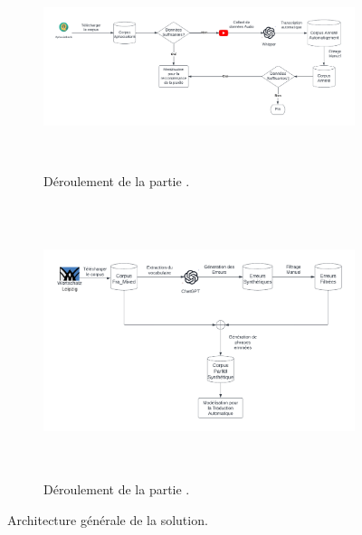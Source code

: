 \begin{figure}[hbt]
    \begin{subfigure}{\textwidth}
        \begin{center}
            \includegraphics[height=6cm]{assets/pdf/ASR.pdf}
        \end{center}
        \caption{Déroulement de la partie .}
        \label{fig.asr-archi}
    \end{subfigure}
    \begin{subfigure}{\textwidth}
        \begin{center}
            \includegraphics[height=8cm]{assets/pdf/NMT.pdf}
        \end{center}
        \caption{Déroulement de la partie .}
        \label{fig.nmt-archi}
    \end{subfigure}
    \caption{Architecture générale de la solution.}
    \label{fig.archi} 
\end{figure}

